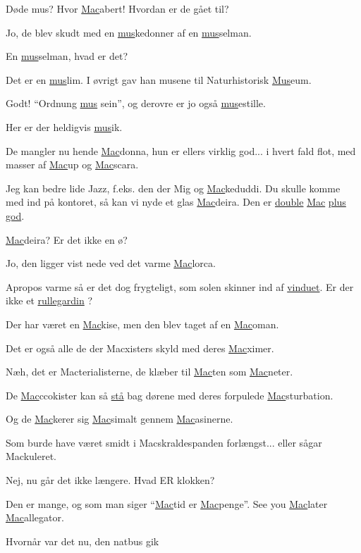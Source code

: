 \documentclass[a4paper,11pt]{article}
\begin{document}
\begin{sketch}
 Døde mus? Hvor \underline{Mac}abert! Hvordan er de gået til?

 Jo, de blev skudt med en \underline{mus}kedonner af en
\underline{mus}selman.

 En \underline{mus}selman, hvad er det?

 Det er en \underline{mus}lim.  I øvrigt gav han musene til
Naturhistorisk \underline{Mus}eum.

 Godt! ``Ordnung \underline{mus} sein'', og derovre er jo også
\underline{mus}estille.

 Her er der heldigvis \underline{mus}ik.

 De mangler nu hende \underline{Mac}donna, hun er ellers virklig
god... i hvert fald flot, med masser af \underline{Mac}up og
\underline{Mac}scara.

 Jeg kan bedre lide Jazz, f.eks. den der Mig og
\underline{Mac}keduddi. Du skulle komme med ind på kontoret, så kan vi nyde et
glas \underline{Mac}deira. Den er \underline{double} \underline{Mac}
\underline{plus} \underline{god}.

 \underline{Mac}deira? Er det ikke en ø?

 Jo, den ligger vist nede ved det varme \underline{Mac}lorca.

  Apropos varme så er det dog frygteligt,
som solen skinner ind af \underline{vinduet}. Er der ikke et
\underline{rullegardin} ?

 Der har været en \underline{Mac}kise, men den blev taget af en
\underline{Mac}oman.

 Det er også alle de der Macxisters skyld med deres
\underline{Mac}ximer.

 Næh, det er Macterialisterne, de klæber til \underline{Mac}ten som
\underline{Mac}neter.

 De \underline{Mac}ccokister kan så \underline{stå} bag dørene med deres
forpulede \underline{Mac}sturbation.

 Og de \underline{Mac}kerer sig \underline{Mac}simalt gennem
\underline{Mac}asinerne.

 Som burde have været smidt i Macskraldespanden forlængst... eller sågar
Mackuleret.

 Nej, nu går det ikke længere. Hvad ER klokken?

 Den er mange, og som man siger ``\underline{Mac}tid er
\underline{Mac}penge''. See you \underline{Mac}later
\underline{Mac}allegator. 

 Hvornår var det nu, den natbus gik 
\end{sketch}
\end{document}
